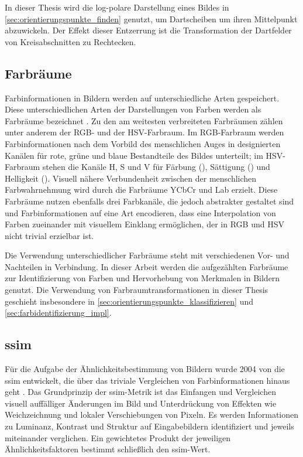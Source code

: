 In dieser Thesis wird die log-polare Darstellung eines Bildes in \autoref{sec:orientierungspunkte_finden} genutzt, um Dartscheiben um ihren Mittelpunkt abzuwickeln. Der Effekt dieser Entzerrung ist die Transformation der Dartfelder von Kreisabschnitten zu Rechtecken.


\subsection{Farbräume}
\label{sec:farbräume}

Farbinformationen in Bildern werden auf unterschiedliche Arten gespeichert. Diese unterschiedlichen Arten der Darstellungen von Farben werden als Farbräume bezeichnet \cite{color_space,cv_general}. Zu den am weitesten verbreiteten Farbräumen zählen unter anderem der RGB- und der HSV-Farbraum. Im RGB-Farbraum werden Farbinformationen nach dem Vorbild des menschlichen Auges in designierten Kanälen für rote, grüne und blaue Bestandteile des Bildes unterteilt; im HSV-Farbraum stehen die Kanäle H, S und V für Färbung (), Sättigung () und Helligkeit (). Visuell nähere Verbundenheit zwischen der menschlichen Farbwahrnehmung wird durch die Farbräume YCbCr und Lab erzielt. Diese Farbräume nutzen ebenfalls drei Farbkanäle, die jedoch abstrakter gestaltet sind und Farbinformationen auf eine Art encodieren, dass eine Interpolation von Farben zueinander mit visuellem Einklang ermöglichen, der in RGB und HSV nicht trivial erzielbar ist.

Die Verwendung unterschiedlicher Farbräume steht mit verschiedenen Vor- und Nachteilen in Verbindung. In dieser Arbeit werden die aufgezählten Farbräume zur Identifizierung von Farben und Hervorhebung von Merkmalen in Bildern genutzt. Die Verwendung von Farbraumtransformationen in dieser Thesis geschieht insbesondere in \autoref{sec:orientierungspunkte_klassifizieren} und \autoref{sec:farbidentifizierung_impl}.


\newpage
\subsection{\acl{ssim}}
\label{sec:ssim}

Für die Aufgabe der Ähnlichkeitsbestimmung von Bildern wurde 2004 von \citeauthor{ssim} die \acf{ssim} entwickelt, die über das triviale Vergleichen von Farbinformationen hinaus geht \cite{ssim,cv_general}. Das Grundprinzip der \ac{ssim}-Metrik ist das Einfangen und Vergleichen visuell auffälliger Änderungen im Bild und Unterdrückung von Effekten wie Weichzeichnung und lokaler Verschiebungen von Pixeln. Es werden Informationen zu Luminanz, Kontrast und Struktur auf Eingabebildern identifiziert und jeweils miteinander verglichen. Ein gewichtetes Produkt der jeweiligen Ähnlichkeitsfaktoren bestimmt schließlich den \ac{ssim}-Wert.

